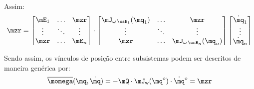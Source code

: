\documentclass[]{politex}
\begin{document}
Assim:
\begin{equation} \label{eq:VinculosVelAng}
\mzr =
\begin{bmatrix}
\mE_1 & \ldots & \mzr\\
\vdots & \ddots & \vdots\\
\mzr &\ldots  & \mE_{n}
\end{bmatrix}
\cdot
\begin{bmatrix}
\mJ_{\omega\,\ssB_1}(\mq_1) & \ldots & \mzr\\
\vdots & \ddots & \vdots\\
\mzr &\ldots  & \mJ_{\omega\,\ssB_n}(\mq_n)
\end{bmatrix}
\begin{bmatrix}
\dot{\mq}_1 \\
\vdots \\
\dot{\mq}_n
\end{bmatrix}
\end{equation}

Sendo assim, os vínculos de posição entre subsistemas podem ser descritos de maneira genérica por:
\begin{equation}
\overline{\momega}(\mq,\dot{\mq}) = - \mQ \cdot \mJ_{\mathsf{w}}(\mq^\diamond) \cdot \dot{\mq}^\diamond  = \mzr
\end{equation}
\end{document}
